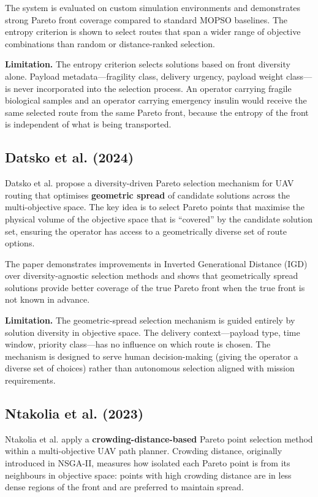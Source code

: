The system is evaluated on custom simulation environments and demonstrates strong Pareto
front coverage compared to standard MOPSO baselines. The entropy criterion is shown to
select routes that span a wider range of objective combinations than random or
distance-ranked selection.

\textbf{Limitation.} The entropy criterion selects solutions based on front diversity
alone. Payload metadata---fragility class, delivery urgency, payload weight class---is
never incorporated into the selection process. An operator carrying fragile biological
samples and an operator carrying emergency insulin would receive the same selected route
from the same Pareto front, because the entropy of the front is independent of what is
being transported.

\subsection{Datsko et al. (2024)}

Datsko et al. \cite{datsko2024} propose a diversity-driven Pareto selection mechanism for
UAV routing that optimises \textbf{geometric spread} of candidate solutions across the
multi-objective space. The key idea is to select Pareto points that maximise the physical
volume of the objective space that is ``covered'' by the candidate solution set, ensuring
the operator has access to a geometrically diverse set of route options.

The paper demonstrates improvements in Inverted Generational Distance (IGD) over
diversity-agnostic selection methods and shows that geometrically spread solutions
provide better coverage of the true Pareto front when the true front is not known in
advance.

\textbf{Limitation.} The geometric-spread selection mechanism is guided entirely by
solution diversity in objective space. The delivery context---payload type, time window,
priority class---has no influence on which route is chosen. The mechanism is designed to
serve human decision-making (giving the operator a diverse set of choices) rather than
autonomous selection aligned with mission requirements.

\subsection{Ntakolia et al. (2023)}

Ntakolia et al. \cite{ntakolia2023} apply a \textbf{crowding-distance-based} Pareto
point selection method within a multi-objective UAV path planner. Crowding distance,
originally introduced in NSGA-II, measures how isolated each Pareto point is from its
neighbours in objective space: points with high crowding distance are in less dense
regions of the front and are preferred to maintain spread.

